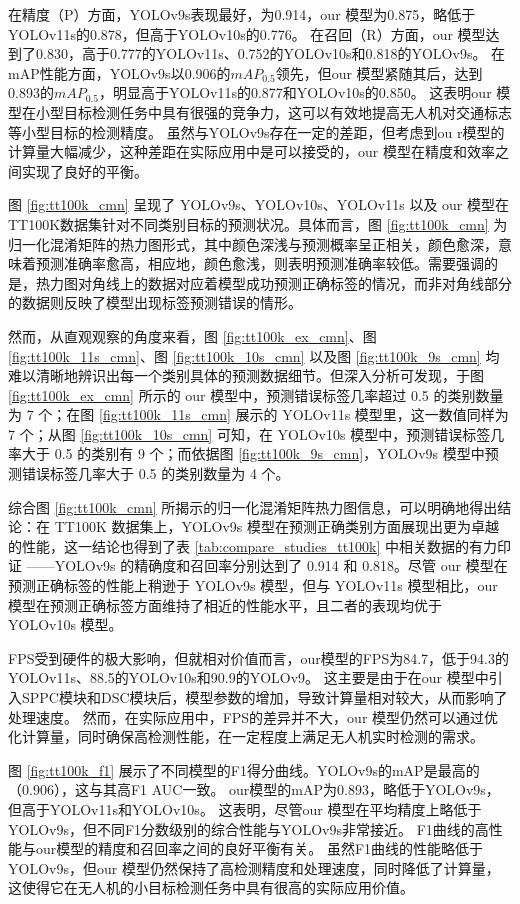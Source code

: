 在精度（P）方面，YOLOv9s表现最好，为0.914，our 模型为0.875，略低于YOLOv11s的0.878，但高于YOLOv10s的0.776。
在召回（R）方面，our 模型达到了0.830，高于0.777的YOLOv11s、0.752的YOLOv10s和0.818的YOLOv9s。
在mAP性能方面，YOLOv9s以0.906的$mAP_{0.5}$领先，但our 模型紧随其后，达到0.893的$mAP_{0.5}$，明显高于YOLOv11s的0.877和YOLOv10s的0.850。
这表明our 模型在小型目标检测任务中具有很强的竞争力，这可以有效地提高无人机对交通标志等小型目标的检测精度。
虽然与YOLOv9s存在一定的差距，但考虑到ou r模型的计算量大幅减少，这种差距在实际应用中是可以接受的，our 模型在精度和效率之间实现了良好的平衡。

图 \ref{fig:tt100k_cmn} 呈现了 YOLOv9s、YOLOv10s、YOLOv11s 以及 our 模型在TT100K数据集针对不同类别目标的预测状况。具体而言，图 \ref{fig:tt100k_cmn} 为归一化混淆矩阵的热力图形式，其中颜色深浅与预测概率呈正相关，颜色愈深，意味着预测准确率愈高，相应地，颜色愈浅，则表明预测准确率较低。需要强调的是，热力图对角线上的数据对应着模型成功预测正确标签的情况，而非对角线部分的数据则反映了模型出现标签预测错误的情形。

然而，从直观观察的角度来看，图 \ref{fig:tt100k_ex_cmn}、图 \ref{fig:tt100k_11s_cmn}、图 \ref{fig:tt100k_10s_cmn} 以及图 \ref{fig:tt100k_9s_cmn} 均难以清晰地辨识出每一个类别具体的预测数据细节。但深入分析可发现，于图 \ref{fig:tt100k_ex_cmn} 所示的 our 模型中，预测错误标签几率超过 0.5 的类别数量为 7 个；在图 \ref{fig:tt100k_11s_cmn} 展示的 YOLOv11s 模型里，这一数值同样为 7 个；从图 \ref{fig:tt100k_10s_cmn} 可知，在 YOLOv10s 模型中，预测错误标签几率大于 0.5 的类别有 9 个；而依据图 \ref{fig:tt100k_9s_cmn}，YOLOv9s 模型中预测错误标签几率大于 0.5 的类别数量为 4 个。

综合图 \ref{fig:tt100k_cmn} 所揭示的归一化混淆矩阵热力图信息，可以明确地得出结论：在 TT100K 数据集上，YOLOv9s 模型在预测正确类别方面展现出更为卓越的性能，这一结论也得到了表 \ref{tab:compare_studies_tt100k} 中相关数据的有力印证 ——YOLOv9s 的精确度和召回率分别达到了 0.914 和 0.818。尽管 our 模型在预测正确标签的性能上稍逊于 YOLOv9s 模型，但与 YOLOv11s 模型相比，our 模型在预测正确标签方面维持了相近的性能水平，且二者的表现均优于 YOLOv10s 模型。

FPS受到硬件的极大影响，但就相对价值而言，our模型的FPS为84.7，低于94.3的YOLOv11s、88.5的YOLOv10s和90.9的YOLOv9。 这主要是由于在our 模型中引入SPPC模块和DSC模块后，模型参数的增加，导致计算量相对较大，从而影响了处理速度。 然而，在实际应用中，FPS的差异并不大，our 模型仍然可以通过优化计算量，同时确保高检测性能，在一定程度上满足无人机实时检测的需求。

图 \ref{fig:tt100k_f1} 展示了不同模型的F1得分曲线。YOLOv9s的mAP是最高的（0.906），这与其高F1 AUC一致。 our模型的mAP为0.893，略低于YOLOv9s，但高于YOLOv11s和YOLOv10s。 这表明，尽管our 模型在平均精度上略低于YOLOv9s，但不同F1分数级别的综合性能与YOLOv9s非常接近。 F1曲线的高性能与our模型的精度和召回率之间的良好平衡有关。 虽然F1曲线的性能略低于YOLOv9s，但our 模型仍然保持了高检测精度和处理速度，同时降低了计算量，这使得它在无人机的小目标检测任务中具有很高的实际应用价值。


